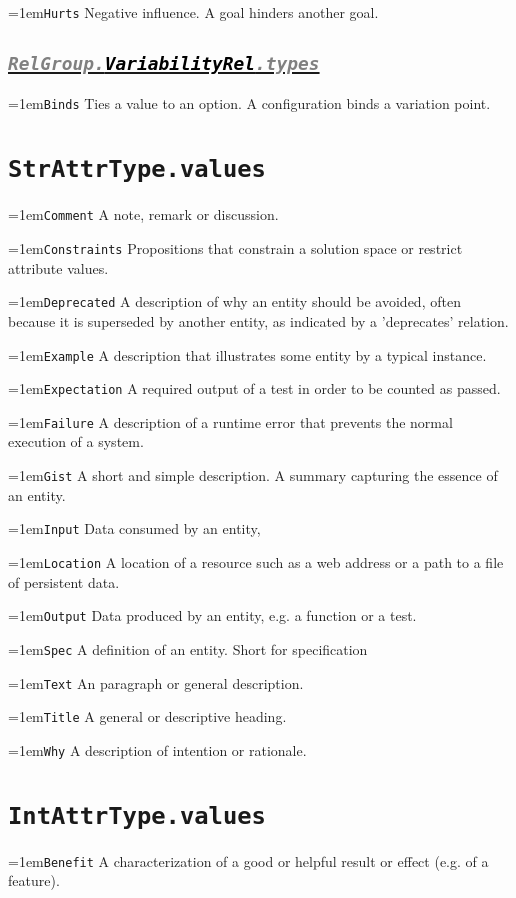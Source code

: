 \documentclass[a4paper,oneside]{article}
\newcommand\Concept[2]{\hangindent=1em\lstinline+#1+ #2}
\begin{document}
\begin{multicols*}{4}
\Concept{Hurts}{Negative influence. A goal hinders another goal.}


\subsection*{\underline{\texttt{\textit{{\textcolor{gray}{RelGroup.}\textcolor{black}{VariabilityRel}}\textcolor{gray}{.types}}}}}
\Concept{Binds}{Ties a value to an option. A configuration binds a variation point.}



\vfill\null\columnbreak
\section*{\texttt{StrAttrType.values}}
\Concept{Comment}{A note, remark or discussion.}

\Concept{Constraints}{Propositions that constrain a solution space or restrict attribute values.}

\Concept{Deprecated}{A description of why an entity should be avoided, often because it is superseded by another entity, as indicated by a 'deprecates' relation.}

\Concept{Example}{A description that illustrates some entity by a typical instance.}

\Concept{Expectation}{A required output of a test in order to be counted as passed.}

\Concept{Failure}{A description of a runtime error that prevents the normal execution of a system.}

\Concept{Gist}{A short and simple description. A summary capturing the essence of an entity.}

\Concept{Input}{Data consumed by an entity, }

\Concept{Location}{A location of a resource such as a web address or a path to a file of persistent data.}

\Concept{Output}{Data produced by an entity, e.g. a function or a test.}

\Concept{Spec}{A definition of an entity. Short for specification}

\Concept{Text}{An paragraph or general description.}

\Concept{Title}{A general or descriptive heading.}

\Concept{Why}{A description of intention or rationale.}


\section*{\texttt{IntAttrType.values}}
\Concept{Benefit}{A characterization of a good or helpful result or effect (e.g. of a feature).}


\end{multicols*}
\end{document}
